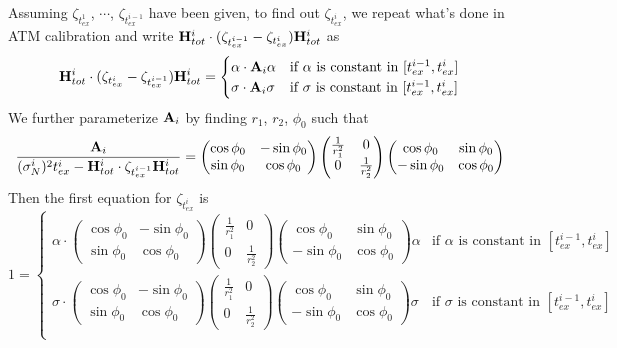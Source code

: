 \documentclass[10pt]{article}
\theoremstyle{plain}
\numberwithin{equation}{section}
\numberwithin{table}{section}
\begin{document}
Assuming $\zeta_{t_{ex}^1}$, $\cdots$, $\zeta_{t_{ex}^{i-1}}$ have
been given, to find out $\zeta_{t_{ex}^i}$, we repeat what's done in
ATM calibration and write ${\bf H}_{tot}^i \cdot (\zeta_{t_{ex}^{i-1}}
- \zeta_{t_{ex}^i}) {\bf H}_{tot}^i$ as
\[
{\bf H}_{tot}^i \cdot (\zeta_{t_{ex}^{i}} - \zeta_{t_{ex}^{i-1}}) {\bf
H}_{tot}^i = \begin{cases}
\alpha \cdot {\bf A}_i \alpha & \mbox{if $\alpha$ is constant in
$[t_{ex}^{i-1}, t_{ex}^i]$} \\
\sigma \cdot {\bf A}_i \sigma & \mbox{if $\sigma$ is constant in
$[t_{ex}^{i-1}, t_{ex}^i]$} \\
\end{cases}
\]
We further parameterize ${\bf A}_i$ by finding $r_1$, $r_2$, $\phi_0$ such that
\[
\frac{{\bf A}_i}{(\sigma_N^i)^2t_{ex}^i - {\bf H}_{tot}^i \cdot
\zeta_{t_{ex}^{i-1}}{\bf H}_{tot}^i} =
\left(\begin{matrix}\cos\phi_0 & -\sin\phi_0 \\ \sin\phi_0 &
\cos\phi_0 \end{matrix} \right)
\left(\begin{matrix}\frac{1}{r_1^2} & 0 \\ 0 & \frac{1}{r_2^2}
\end{matrix} \right)
\left(\begin{matrix}\cos\phi_0 & \sin\phi_0 \\ -\sin\phi_0 &
\cos\phi_0 \end{matrix} \right)
\]
Then the first equation for $\zeta_{t_{ex}^i}$ is
\[
1 = \begin{cases}
\alpha \cdot \left(\begin{matrix}\cos\phi_0 & -\sin\phi_0 \\
\sin\phi_0 & \cos\phi_0 \end{matrix} \right)
\left(\begin{matrix}\frac{1}{r_1^2} & 0 \\ 0 & \frac{1}{r_2^2}
\end{matrix} \right)
\left(\begin{matrix}\cos\phi_0 & \sin\phi_0 \\ -\sin\phi_0 &
\cos\phi_0 \end{matrix} \right) \alpha & \mbox{if $\alpha$ is constant
in $[t_{ex}^{i-1}, t_{ex}^i]$} \\
\sigma \cdot \left(\begin{matrix}\cos\phi_0 & -\sin\phi_0 \\
\sin\phi_0 & \cos\phi_0 \end{matrix} \right)
\left(\begin{matrix}\frac{1}{r_1^2} & 0 \\ 0 & \frac{1}{r_2^2}
\end{matrix} \right)
\left(\begin{matrix}\cos\phi_0 & \sin\phi_0 \\ -\sin\phi_0 &
\cos\phi_0 \end{matrix} \right) \sigma & \mbox{if $\sigma$ is constant
in $[t_{ex}^{i-1}, t_{ex}^i]$} \\
\end{cases}
\]
\end{document}
